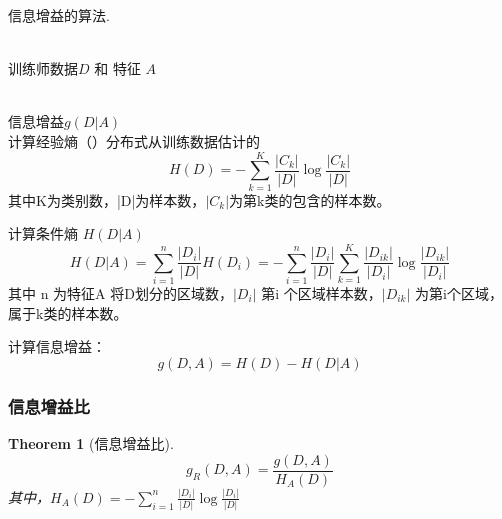 \documentclass[UTF8]{ctexart}
\newtheorem{thm}{\bf Theorem}[section]
\begin{document}
\begin{algorithm}[htb] 
	    	\caption{ 信息增益的算法.} 
	    	\label{alg:Framwork} 
	    	\begin{algorithmic}[1] %
	    		\REQUIRE ~~\\ %
	    		训练师数据$D$ 和 特征 $A$
	    		
	    		\ENSURE ~~\\ %
				信息增益$g(D|A)$\\
	
	
				\STATE 计算经验熵（）分布式从训练数据估计的
				$$
				H(D) = -\sum_{k=1}^{K} \frac{|C_k|}{|D|} \log \frac{|C_k|}{|D|}
				$$
				其中K为类别数，|D|为样本数，$|C_k|$为第k类的包含的样本数。
				
				\STATE 计算条件熵 $H(D|A)$
				$$
				H(D|A) = \sum_{i=1}^{n} \frac{|D_i|}{|D|} H(D_i) = -\sum_{i=1}^{n} \frac{|D_i|}{|D|} \sum_{k=1}^{K} \frac{|D_{ik}|}{|D_i|} \log \frac{|D_{ik}|}{|D_i|}
				$$
				其中 n 为特征A 将D划分的区域数，$|D_i|$ 第i 个区域样本数，$|D_{ik}|$ 为第i个区域，属于k类的样本数。
				
				\STATE 计算信息增益：
				$$
				g(D,A) = H(D) - H(D|A)
				$$
				
	    	\end{algorithmic}
  \end{algorithm}

\subsubsection{信息增益比}
\begin{thm}[信息增益比]
	$$
	g_R(D,A) = \frac{g(D,A)}{H_A(D)}
	$$
	其中，$H_A(D) = -\sum_{i=1}^{n} \frac{|D_i|}{|D|} \log \frac{|D_i|}{|D|}$
\end{thm} 
\end{document}
